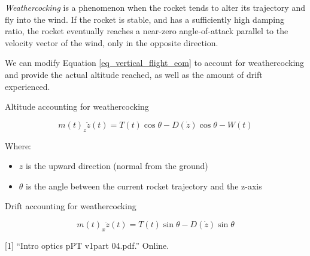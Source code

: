 \documentclass[]{article}
\providecommand{\tightlist}{%
  \setlength{\itemsep}{0pt}\setlength{\parskip}{0pt}}
\begin{document}
\emph{Weathercocking} is a phenomenon when the rocket tends to alter its
trajectory and fly into the wind. If the rocket is stable, and has a
sufficiently high damping ratio, the rocket eventually reaches a
near-zero angle-of-attack parallel to the velocity vector of the wind,
only in the opposite direction.

We can modify Equation \ref{eq_vertical_flight_eom} to account for
weathercocking and provide the actual altitude reached, as well as the
amount of drift experienced.

Altitude accounting for weathercocking

\begin{equation}
\label{eq_vertical_angle}
m(t)_z\ddot{z}(t) = T(t) \cos \theta - D(\dot{z}) \cos \theta - W(t)
\end{equation}

Where:

\begin{itemize}
\tightlist
\item
  \(z\) is the upward direction (normal from the ground)
\item
  \(\theta\) is the angle between the current rocket trajectory and the
  z-axis
\end{itemize}

Drift accounting for weathercocking

\begin{equation}
\label{eq_vertical_angle}
m(t)_x \ddot{z}(t) = T(t) \sin \theta - D(\dot{z}) \sin \theta 
\end{equation}

{[}1{]} ``Intro optics pPT v1part 04.pdf.'' Online.
\end{document}
